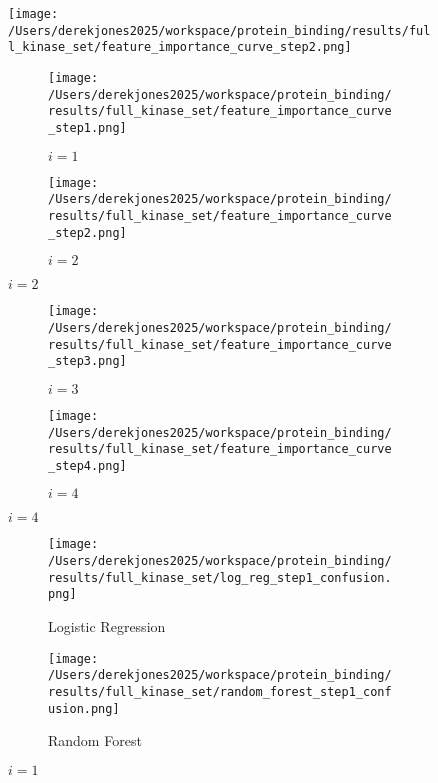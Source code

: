\documentclass{article}
\begin{document}
\begin{center}
\begin{figure}[htpb!]
\texttt{[image: /Users/derekjones2025/workspace/protein\_binding/results/full\_kinase\_set/feature\_importance\_curve\_step2.png]}
\end{figure}
\end{center}



\begin{figure}[htpb!]
\begin{subfigure}{.5\textwidth}
  \texttt{[image: /Users/derekjones2025/workspace/protein\_binding/results/full\_kinase\_set/feature\_importance\_curve\_step1.png]}
  \caption*{$i=1$}
  \label{fig:sub1}
\end{subfigure}%
\begin{subfigure}{.5\textwidth}
  \texttt{[image: /Users/derekjones2025/workspace/protein\_binding/results/full\_kinase\_set/feature\_importance\_curve\_step2.png]}
  \caption*{$i=2$}
  \label{fig:sub2}
\end{subfigure}
\label{fig:test}
\end{figure}



\begin{figure}[htpb!]
\begin{subfigure}{.5\textwidth}
  \texttt{[image: /Users/derekjones2025/workspace/protein\_binding/results/full\_kinase\_set/feature\_importance\_curve\_step3.png]}
  \caption*{$i=3$}
  \label{fig:sub1}
\end{subfigure}%
\begin{subfigure}{.5\textwidth}
  \texttt{[image: /Users/derekjones2025/workspace/protein\_binding/results/full\_kinase\_set/feature\_importance\_curve\_step4.png]}
  \caption*{$i=4$}
  \label{fig:sub2}
\end{subfigure}
\label{fig:test}
\end{figure}




\begin{figure}[htpb!]
\begin{subfigure}{.5\textwidth}
  \texttt{[image: /Users/derekjones2025/workspace/protein\_binding/results/full\_kinase\_set/log\_reg\_step1\_confusion.png]}
  \caption{Logistic Regression}
  \label{fig:sub1}
\end{subfigure}%
\begin{subfigure}{.5\textwidth}
  \texttt{[image: /Users/derekjones2025/workspace/protein\_binding/results/full\_kinase\_set/random\_forest\_step1\_confusion.png]}
  \caption{Random Forest}
  \label{fig:sub2}
\end{subfigure}
\caption*{$i=1$}
\label{fig:test}
\end{figure}
\end{document}

